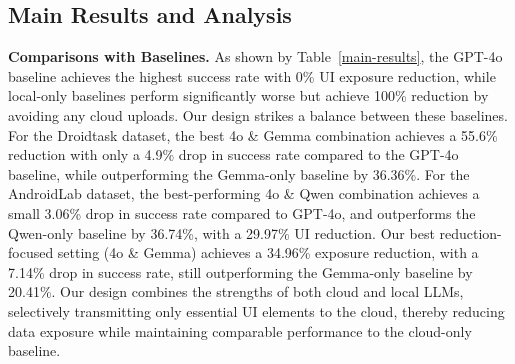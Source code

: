 \subsection{Main Results and Analysis}
\begin{table}[htbp]
  \caption{Our design vs. Baselines from task success rate and UI exposure reduction rate.}
  \label{main-results}
  \centering
\end{table}

\textbf{Comparisons with Baselines.}
As shown by Table~\ref{main-results}, the GPT-4o baseline achieves the highest success rate with 0\% UI exposure reduction, while local-only baselines perform significantly worse but achieve 100\% reduction by avoiding any cloud uploads. Our design strikes a balance between these baselines. For the Droidtask dataset, the best 4o \& Gemma combination achieves a 55.6\% reduction with only a 4.9\% drop in success rate compared to the GPT-4o baseline, while outperforming the Gemma-only baseline by 36.36\%. For the AndroidLab dataset, the best-performing 4o \& Qwen combination achieves a small 3.06\% drop in success rate compared to GPT-4o, and outperforms the Qwen-only baseline by 36.74\%, with a 29.97\% UI reduction. Our best reduction-focused setting (4o \& Gemma) achieves a 34.96\% exposure reduction, with a 7.14\% drop in success rate, still outperforming the Gemma-only baseline by 20.41\%. Our design combines the strengths of both cloud and local LLMs, selectively transmitting only essential UI elements to the cloud, thereby reducing data exposure while maintaining comparable performance to the cloud-only baseline.

